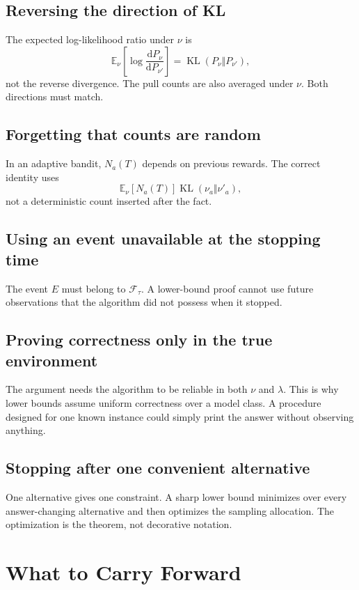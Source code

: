 \documentclass[en,nofont,11pt]{elegantbook}
\newcommand{\E}{\mathbb{E}}
\newcommand{\KL}{\operatorname{KL}}
\newcommand{\dd}{\mathrm{d}}
\newcommand{\calF}{\mathcal{F}}
\begin{document}
\section{Reversing the direction of KL}

The expected log-likelihood ratio under $\nu$ is
\[
\E_\nu\left[\log\frac{\dd P_\nu}{\dd P_{\nu'}}\right]
=
\KL(P_\nu\Vert P_{\nu'}),
\]
not the reverse divergence. The pull counts are also averaged under $\nu$. Both directions must match.

\section{Forgetting that counts are random}

In an adaptive bandit, $N_a(T)$ depends on previous rewards. The correct identity uses
\[
\E_\nu[N_a(T)]\KL(\nu_a\Vert\nu'_a),
\]
not a deterministic count inserted after the fact.

\section{Using an event unavailable at the stopping time}

The event $E$ must belong to $\calF_\tau$. A lower-bound proof cannot use future observations that the algorithm did not possess when it stopped.

\section{Proving correctness only in the true environment}

The argument needs the algorithm to be reliable in both $\nu$ and $\lambda$. This is why lower bounds assume uniform correctness over a model class. A procedure designed for one known instance could simply print the answer without observing anything.

\section{Stopping after one convenient alternative}

One alternative gives one constraint. A sharp lower bound minimizes over every answer-changing alternative and then optimizes the sampling allocation. The optimization is the theorem, not decorative notation.

\chapter{What to Carry Forward}
\end{document}
